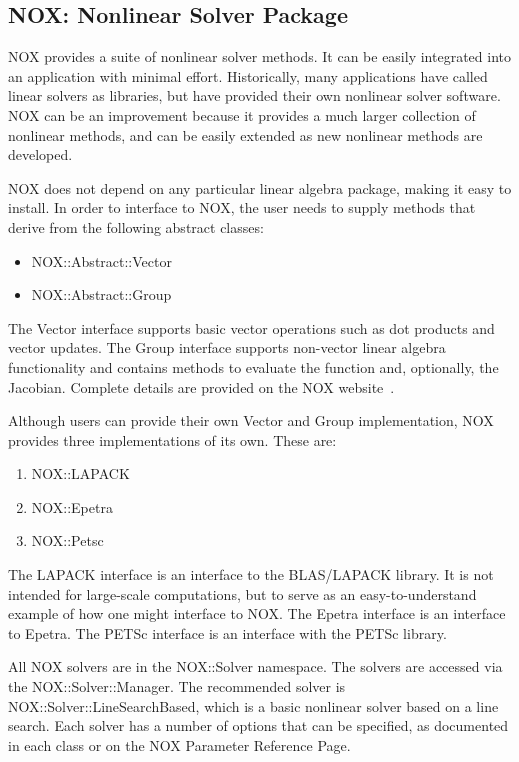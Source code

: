\documentclass[12pt,relax]{SANDreport}
\begin{document}
\subsection{NOX: Nonlinear Solver Package}

NOX provides a suite of nonlinear solver methods.  It can be easily integrated
into an application with minimal effort.  Historically, many applications have called
linear solvers as libraries, but have provided their own nonlinear solver software.  NOX
can be an improvement because it provides a much larger collection of nonlinear methods,
and can be easily extended as new nonlinear methods are developed.  

NOX does not depend on any particular linear algebra package, making it easy to install. In
order to interface to NOX, the user needs to supply methods that derive from the following abstract classes: 
\begin{itemize}
\item NOX::Abstract::Vector
\item NOX::Abstract::Group
\end{itemize}
The Vector interface supports basic vector operations such as dot products and vector updates. 
The Group interface supports non-vector linear algebra functionality and contains methods 
to evaluate the function and, optionally, the Jacobian.
Complete details are provided on the NOX website~\cite{NOX-home-page}.

Although users can provide their own Vector and Group implementation, NOX provides three implementations
of its own.  These are:
\begin{enumerate}
\item NOX::LAPACK
\item NOX::Epetra
\item NOX::Petsc
\end{enumerate}
The LAPACK interface is an interface to the BLAS/LAPACK library. It is not intended for large-scale
computations, but to serve as an easy-to-understand example of how one might interface to NOX. 
The Epetra interface is an interface to Epetra.
The PETSc interface is an interface with the PETSc library. 

All NOX solvers are in the NOX::Solver namespace. The solvers are accessed via the NOX::Solver::Manager. The
recommended solver is NOX::Solver::LineSearchBased, which is a basic nonlinear solver based on a line search.
Each solver has a number of options that can be specified, as documented in each class or on the NOX Parameter
Reference Page. 
\end{document}
